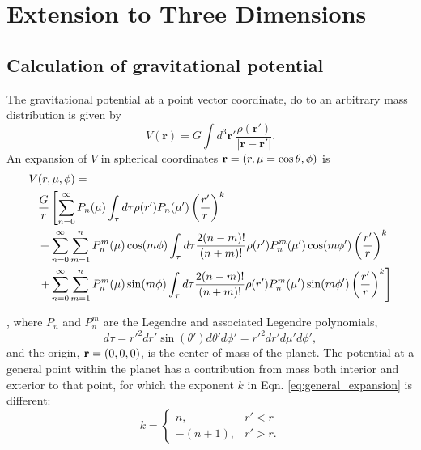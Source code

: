 \section{Extension to Three Dimensions} \label{method_derivation}

\subsection{Calculation of gravitational potential} \label{calc_grav_pot}

The gravitational potential at a point vector coordinate, do to an arbitrary mass
distribution is given by 
%
\begin{equation} \label{eq:basicV}
    V(\mathbf{r}) = G \int d^3\mathbf{r'}
    \frac{\rho(\mathbf{r'})}{\left|\mathbf{r}-\mathbf{r'}\right|}.
\end{equation} 
%
An expansion of $V$ in spherical coordinates ${\bf r} = (r,\mu =
\cos{\theta},\phi)$ is
%
\begin{equation}
    \begin{aligned} V&(r,\mu,\phi) = \\
        &\frac{G}{r} \left[ \sum_{n=0}^{\infty} P_n(\mu) \int_{\tau} d\tau
            \rho(r')P_n(\mu')\left(\frac{r'}{r}\right)^k \right. \\ & +
            \sum_{n=0}^{\infty} \sum_{m=1}^{n} P^m_n(\mu)\cos(m\phi) \int_{\tau} d\tau
            \frac{2(n-m)!}{(n+m)!} \rho(r')P_n^m(\mu')\cos(m\phi')
            \left(\frac{r'}{r}\right)^k \\ & \left.  + \sum_{n=0}^{\infty}
            \sum_{m=1}^{n} P^m_n(\mu)\sin(m\phi) \int_{\tau} d\tau \frac{2(n-m)!}{(n+m)!}
            \rho(r')P_n^m(\mu')\sin(m\phi') \left(\frac{r'}{r}\right)^k \right]
        \end{aligned} \label{eq:general_expansion}
    \end{equation}

\citep{zharkov1978}, where $P_n$ and $P_n^m$ are the Legendre and associated Legendre
polynomials, 
%
\begin{equation*} d\tau = r'^2 dr' \sin(\theta')d\theta' d\phi' = r'^2 dr' d\mu' d\phi',
\end{equation*}
%
and the origin, ${\bf r}=(0,0,0)$, is the center of mass of the planet.  The
potential at a general point within the planet has a contribution from mass both
interior and exterior to that point, for which the exponent $k$ in Eqn.
\eqref{eq:general_expansion} is different:
%
\begin{equation*} k = \begin{cases} n, & r' < r \\ -(n+1), & r' > r .  \end{cases}
\end{equation*}

